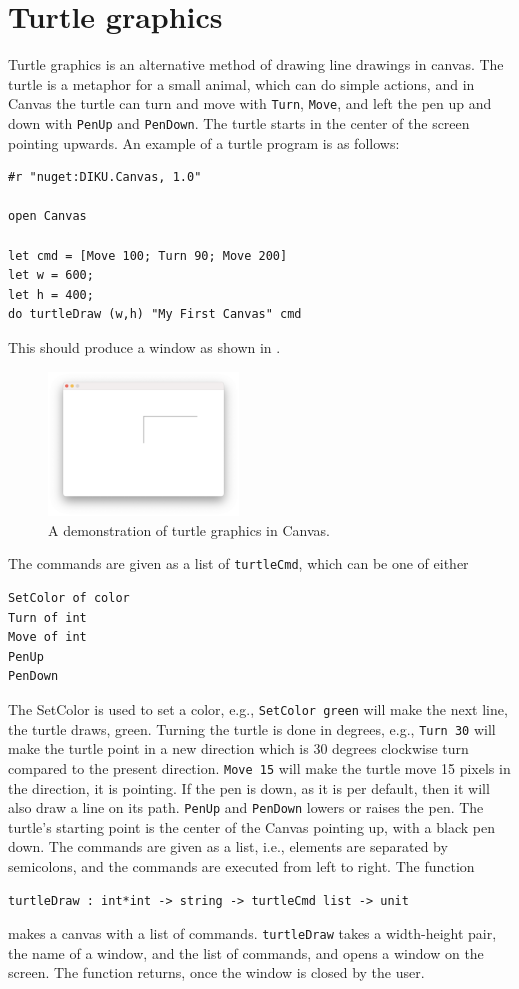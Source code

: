 \documentclass{article}
\begin{document}
\section{Turtle graphics}
Turtle graphics is an alternative method of drawing line drawings in canvas. The turtle is a metaphor for a small animal, which can do simple actions, and in Canvas the turtle can turn and move with \lstinline{Turn}, \lstinline{Move}, and left the pen up and down with \lstinline{PenUp} and \lstinline{PenDown}. The turtle starts in the center of the screen pointing upwards. An example of a turtle program is as follows:
\begin{lstlisting}
#r "nuget:DIKU.Canvas, 1.0"

open Canvas

let cmd = [Move 100; Turn 90; Move 200]
let w = 600;
let h = 400;
do turtleDraw (w,h) "My First Canvas" cmd
\end{lstlisting}
This should produce a window as shown in .
\begin{figure}
  \centering
  \includegraphics[width=0.45\textwidth]{myFirstTurtle}
  \caption{A demonstration of turtle graphics in Canvas.}
  \label{fig:myFirstTurtle}
\end{figure}
The commands are given as a list of \lstinline{turtleCmd}, which can be one of either
\begin{lstlisting}
SetColor of color
Turn of int
Move of int
PenUp
PenDown
\end{lstlisting}
The SetColor is used to set a color, e.g., \lstinline{SetColor green} will make the next line, the turtle draws, green. Turning the turtle is done in degrees, e.g., \lstinline{Turn 30} will make the turtle point in a new direction which is 30 degrees clockwise turn compared to the present direction.  \lstinline{Move 15} will make the turtle move 15 pixels in the direction, it is pointing. If the pen is down, as it is per default, then it will also draw a line on its path. \lstinline{PenUp} and \lstinline{PenDown} lowers or raises the pen. The turtle's starting point is the center of the Canvas pointing up, with a black pen down. The commands are given as a list, i.e.,  elements are separated by semicolons, and the commands are executed from left to right. The function
\begin{lstlisting}
turtleDraw : int*int -> string -> turtleCmd list -> unit
\end{lstlisting}
makes a canvas with a list of commands. \lstinline{turtleDraw} takes a width-height pair, the name of a window, and the list of commands, and opens a window on the screen. The function returns, once the window is closed by the user. 
\end{document}
